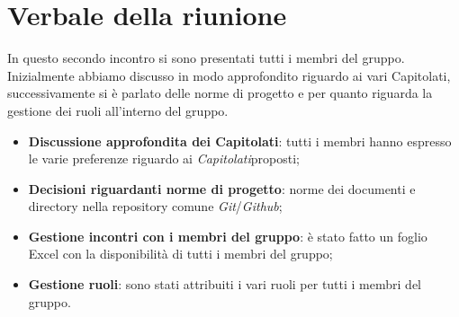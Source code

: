 \section{Verbale della riunione}
		In questo secondo incontro si sono presentati tutti i membri del gruppo. Inizialmente abbiamo discusso in modo approfondito riguardo ai vari {Capitolati\glos}, successivamente si è parlato delle norme di progetto e per quanto riguarda la gestione dei ruoli all'interno del gruppo.
	\begin{itemize}
		\item \textbf {Discussione approfondita dei Capitolati\glos}: tutti i membri hanno espresso le varie preferenze riguardo ai \textit{Capitolati}\glo proposti;
		\item \textbf {Decisioni riguardanti norme di progetto}: norme dei documenti e directory nella repository comune \textit{Git}\glos/\textit{Github}\glos;
		\item \textbf {Gestione incontri con i membri del gruppo}: è stato fatto un foglio Excel con la disponibilità di tutti i membri del gruppo;
		\item \textbf {Gestione ruoli}: sono stati attribuiti i vari ruoli per tutti i membri del gruppo.
	\end{itemize}
